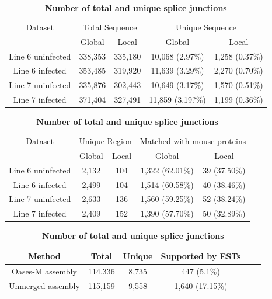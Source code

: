\documentclass[10pt]{article}
\begin{document}
\begin{table}[!ht]
\caption{
\bf{Unique sequences from global and local assembly}}
\begin{tabular}{ccccc}
\hline
Dataset & \multicolumn{2}{c}{Total Sequence} & \multicolumn{2}{c}{Unique Sequence}\\
 & Global & Local & Global & Local\\
\hline
Line 6 uninfected & 338,353 & 335,180 & 10,068 (2.97\%) & 1,258 (0.37\%)\\
Line 6 infected & 353,485 & 319,920 & 11,639 (3.29\%)& 2,270 (0.70\%)\\
Line 7 uninfected & 335,876 & 302,443 & 10,649 (3.17\%) & 1,570 (0.51\%)\\
Line 7 infected & 371,404 & 327,491 & 11,859 (3.19?\%)& 1,199 (0.36\%)\\
\hline
\end{tabular}
\label{unique_sequences}

\caption{
\bf{Unique regions from global and local assembly}}
\begin{tabular}{ccccc}
\hline
Dataset & \multicolumn{2}{c}{Unique Region} & \multicolumn{2}{c}{Matched with mouse proteins}\\
 & Global & Local & Global & Local\\
\hline
Line 6 uninfected & 2,132 & 104 & 1,322 (62.01\%) & 39 (37.50\%)\\
Line 6 infected & 2,499 & 104 & 1,514 (60.58\%)& 40 (38.46\%)\\
Line 7 uninfected & 2,633 & 136 & 1,560 (59.25\%) & 52 (38.24\%)\\
Line 7 infected & 2,409 & 152 & 1,390 (57.70\%)& 50 (32.89\%)\\
\hline
\end{tabular}
\label{unique_sequences_matched_mouse}

\caption{
\bf{Number of total and unique splice junctions}}
\begin{tabular}{cccccc}
\hline
Method& Total & Unique & Supported by ESTs \\ 
\hline
Oases-M assembly & 114,336 & 8,735 & 447 (5.1\%) \\
Unmerged assembly & 115,159 & 9,558 & 1,640 (17.15\%) \\
\hline
\end{tabular}
\label{Oases-M}


\end{table}
\end{document}
